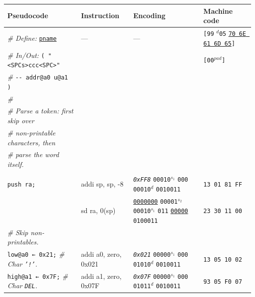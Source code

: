 \documentclass[a4paper,12pt,final]{article}
\begin{document}
\begin{table}[!htbp]
\begin{adjustwidth}{-1cm}{-1cm}
\begin{center}
\end{center}
\normalsize \end{adjustwidth} \end{table} \vspace{0}

\begin{table}[!htbp] \begin{adjustwidth}{-1cm}{-1cm} \fontsize{8}{9.600000}\selectfont
\begin{center}
\begin{tabular}{l|ll|l}
\textbf{Pseudocode} & \textbf{Instruction} & \textbf{Encoding} & \textbf{Machine code}\\[0pt]
\hline
\emph{\# Define:} \uline{\texttt{pname}} & --- & --- & \texttt{[99} \(^{d}\)​\texttt{05} \uline{\texttt{70 6E 61 6D 65}}​\texttt{]}\\[0pt]
\emph{\# In/Out:}   \texttt{( "<SPCs>ccc<SPC>"} &  &  & \texttt{[00}​\(^{pad}\)​\texttt{]}\\[0pt]
\emph{\#}\hspace{3.35em} \texttt{-​- addr@a0 u@a1 )} &  &  & \\[0pt]
\emph{\#} &  &  & \\[0pt]
\emph{\# Parse a token: first skip over} &  &  & \\[0pt]
\emph{\# non-printable characters, then} &  &  & \\[0pt]
\emph{\# parse the word itself.} &  &  & \\[0pt]
 &  &  & \\[0pt]
\texttt{push ra;} & addi sp, sp, -8 & \emph{\texttt{0xFF8}}                    \texttt{00010}​\(^{s_{1}}\) \texttt{000} \texttt{00010}​\(^{d}\)  \texttt{0010011} & \texttt{13 01 81 FF}\\[0pt]
 & sd ra, 0(sp) & \uline{\texttt{0000000}} \texttt{00001}​\(^{s_{2}}\) \texttt{00010}​\(^{s_{1}}\) \texttt{011} \uline{\texttt{00000}} \texttt{0100011} & \texttt{23 30 11 00}\\[0pt]
\emph{\# Skip non-printables.} &  &  & \\[0pt]
\texttt{low@a0 ← 0x21;}   \emph{\# Char \texttt{'!'}.} & addi a0, zero, 0x021 & \emph{\texttt{0x021}}                    \texttt{00000}​\(^{s_{1}}\) \texttt{000} \texttt{01010}​\(^{d}\)  \texttt{0010011} & \texttt{13 05 10 02}\\[0pt]
\texttt{high@a1 ← 0x7F;}  \emph{\# Char \texttt{DEL}.} & addi a1, zero, 0x07F & \emph{\texttt{0x07F}}                    \texttt{00000}​\(^{s_{1}}\) \texttt{000} \texttt{01011}​\(^{d}\)  \texttt{0010011} & \texttt{93 05 F0 07}\\[0pt]

\end{tabular}
\end{center}
\end{adjustwidth}
\end{table}
\end{document}
